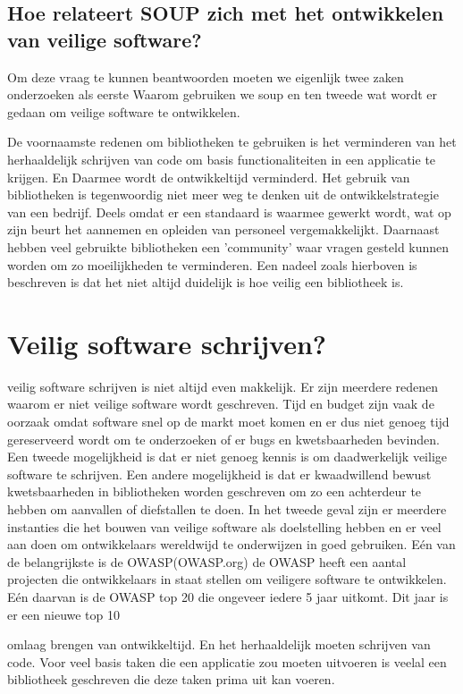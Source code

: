 \subsection{Hoe relateert SOUP zich met het ontwikkelen van veilige software?}
Om deze vraag te kunnen beantwoorden moeten we eigenlijk twee zaken onderzoeken als eerste  Waarom gebruiken we soup en ten tweede wat wordt er gedaan om veilige software te ontwikkelen.

De voornaamste redenen om bibliotheken te gebruiken is het verminderen van het herhaaldelijk schrijven van code om basis functionaliteiten in een applicatie te krijgen. En Daarmee wordt de ontwikkeltijd verminderd. Het gebruik van bibliotheken is tegenwoordig niet meer weg te denken uit de ontwikkelstrategie van een bedrijf. Deels omdat er een standaard is waarmee gewerkt wordt, wat op zijn beurt het aannemen en opleiden van personeel vergemakkelijkt. Daarnaast hebben veel gebruikte bibliotheken een 'community' waar vragen gesteld kunnen worden om zo moeilijkheden te verminderen. Een nadeel zoals hierboven is beschreven is dat het niet altijd duidelijk is hoe veilig een bibliotheek is.

\section{Veilig software schrijven?}
veilig software schrijven is niet altijd even makkelijk. Er zijn meerdere redenen waarom er niet veilige software wordt geschreven. Tijd en budget zijn vaak de oorzaak omdat software snel op de markt moet komen en er dus niet genoeg tijd gereserveerd wordt om te onderzoeken of er bugs en kwetsbaarheden bevinden. Een tweede mogelijkheid is dat er niet genoeg kennis is om daadwerkelijk veilige software te schrijven. Een andere mogelijkheid is dat er kwaadwillend bewust kwetsbaarheden in bibliotheken worden geschreven om zo een achterdeur te hebben om aanvallen of diefstallen te doen.
In het tweede geval zijn er meerdere instanties die het bouwen van veilige software als doelstelling hebben en er veel aan doen om ontwikkelaars wereldwijd te onderwijzen in goed gebruiken. Eén van de belangrijkste is de OWASP(OWASP.org) de OWASP heeft een aantal projecten die ontwikkelaars in staat stellen om veiligere software te ontwikkelen. Eén daarvan is de OWASP top 20 die ongeveer iedere 5 jaar uitkomt. Dit jaar is er een nieuwe top 10

omlaag brengen van ontwikkeltijd. En het herhaaldelijk moeten schrijven van code. Voor veel basis taken die een applicatie zou moeten uitvoeren is veelal een bibliotheek geschreven die deze taken prima uit kan voeren.


